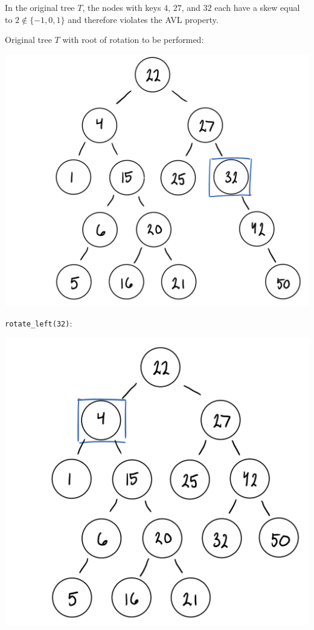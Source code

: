 \documentclass[12pt,twoside]{article}
\begin{document}
\begin{problems}
\begin{problemparts}
\problempart In the original tree $ T $, the nodes with keys $ 4 $, $ 27 $,
    and $ 32 $ each have a skew equal to $ 2 \not\in \{-1, 0, 1 \} $ and
    therefore violates the AVL property.

\problempart Original tree $ T $ with root of rotation to be performed:

    \begin{center}
        \includegraphics[scale=0.4]{Images/P1C1.PNG}
    \end{center}

    {\tt rotate\_left(32)}:

    \begin{center}
        \includegraphics[scale=0.4]{Images/P1C2.PNG}
    \end{center}


\end{problemparts}
\end{problems}
\end{document}
